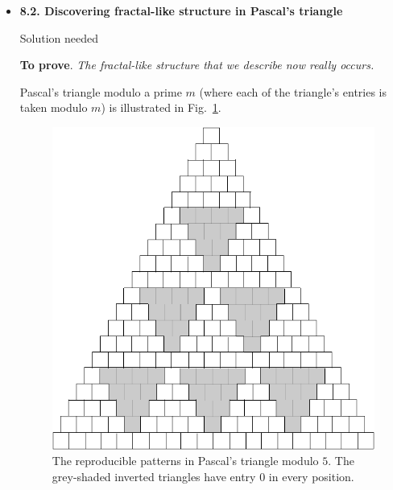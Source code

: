 


\begin{itemize}

\item
{\bf 8.2. Discovering fractal-like structure in Pascal's triangle}

{\Arny Solution needed}

{\bf To prove}.  {\em The fractal-like structure that we describe now really occurs.}

\smallskip

Pascal's triangle modulo a prime $m$ (where each of the triangle's entries is taken modulo $m$) is illustrated in Fig.~\ref{fig:TriangleFractal}.

\begin{figure}[ht]
\begin{center}
	\includegraphics[scale=0.3]{FiguresArithmetic/PascalTriangleFractal.png}
	        \caption{The reproducible patterns in Pascal's triangle modulo $5$.
	        The grey-shaded inverted triangles have entry $0$ in every position.}
        \label{fig:TriangleFractal}
\end{center}
\end{figure}


\end{itemize}
